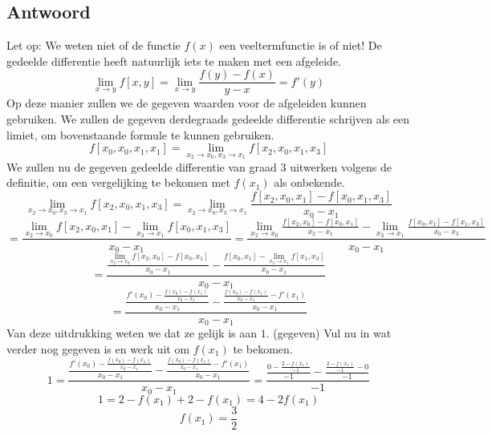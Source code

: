 \documentclass[examenvragen.tex]{subfiles}
\begin{document}
\subsection{Antwoord}
Let op: We weten niet of de functie $f(x)$ een veeltermfunctie is of niet!
De gedeelde differentie heeft natuurlijk iets te maken met een afgeleide.
\[
\lim_{x\rightarrow y}f[x,y] = \lim_{x\rightarrow y}\frac{f(y)-f(x)}{y-x} = f'(y)
\]
Op deze manier zullen we de gegeven waarden voor de afgeleiden kunnen gebruiken.
We zullen de gegeven derdegraads gedeelde differentie schrijven als een limiet, om bovenstaande formule te kunnen gebruiken.
\[
f[x_0,x_0,x_1,x_1] = \lim_{x_2\rightarrow x_0, x_3 \rightarrow x_1}f[x_2,x_0,x_1,x_3]
\]
We zullen nu de gegeven gedeelde differentie van graad $3$ uitwerken volgens de definitie, om een vergelijking te bekomen met $f(x_1)$ als onbekende.
\[
\lim_{x_2\rightarrow x_0, x_3 \rightarrow x_1}
f[x_2,x_0,x_1,x_3]
=
\lim_{x_2\rightarrow x_0, x_3 \rightarrow x_1}
\frac
{f[x_2,x_0,x_1]-f[x_0,x_1,x_3]}
{x_0-x_1}
\]
\[
=
\frac
{\lim_{x_2\rightarrow x_0}f[x_2,x_0,x_1]-\lim_{x_3 \rightarrow x_1}f[x_0,x_1,x_3]}
{x_0-x_1}
=
\frac
{
\lim_{x_2\rightarrow x_0}
\frac{f[x_2,x_0]-f[x_0,x_1]}{x_2-x_1}
-
\lim_{x_3 \rightarrow x_1}\frac{f[x_0,x_1]-f[x_1,x_3]}{x_0-x_3}
}
{x_0-x_1}
\]
\[
=
\frac
{
\frac{\lim_{x_2\rightarrow x_0}f[x_2,x_0]-f[x_0,x_1]}{x_0-x_1}
-
\frac{f[x_0,x_1]-\lim_{x_3 \rightarrow x_1}f[x_1,x_3]}{x_0-x_1}
}
{x_0-x_1}
\]
\[
=
\frac
{
\frac{f'(x_0)-\frac{f(x_0)-f(x_1)}{x_0-x_1}}{x_0-x_1}
-
\frac{\frac{f(x_0)-f(x_1)}{x_0-x_1}-f'(x_1)}{x_0-x_1}
}
{x_0-x_1}
\]
Van deze uitdrukking weten we dat ze gelijk is aan $1$. (gegeven)
Vul nu in wat verder nog gegeven is en werk uit om $f(x_1)$ te bekomen.
\[
1
=
\frac
{
\frac{f'(x_0)-\frac{f(x_0)-f(x_1)}{x_0-x_1}}{x_0-x_1}
-
\frac{\frac{f(x_0)-f(x_1)}{x_0-x_1}-f'(x_1)}{x_0-x_1}
}
{x_0-x_1}
=
\frac
{
\frac{0-\frac{2-f(x_1)}{-1}}{-1}
-
\frac{\frac{2-f(x_1)}{-1}-0}{-1}
}
{-1}
\]
\[
1
=
2-f(x_1)+
2-f(x_1)
= 4-2f(x_1)
\]
\[
f(x_1) = \frac{3}{2}
\]
\end{document}

